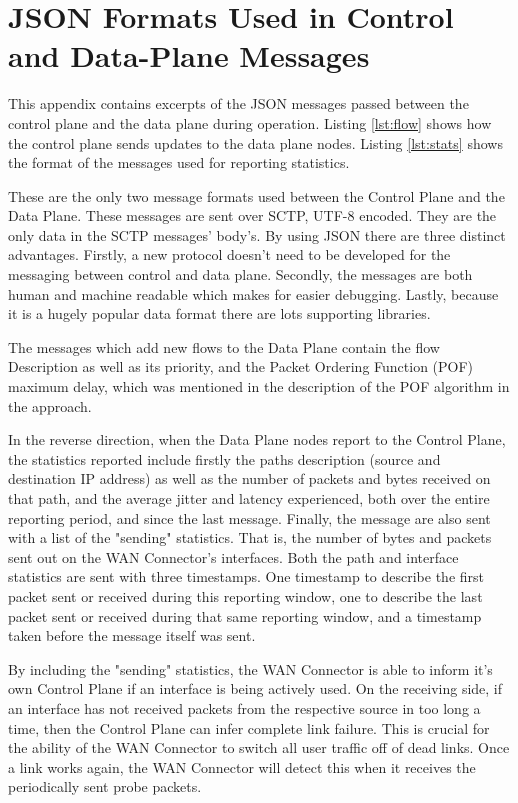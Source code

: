 

\cleardoublepage
\chapter{JSON Formats Used in Control and Data-Plane Messages}
\label{appendix:format}

This appendix contains excerpts of the JSON messages passed between the control plane and the data plane during operation. Listing \ref{lst:flow} shows how the control plane sends updates to the data plane nodes. Listing \ref{lst:stats} shows the format of the messages used for reporting statistics.

These are the only two message formats used between the Control Plane and the Data Plane. These messages are sent over SCTP, UTF-8 encoded. They are the only data in the SCTP messages' body's. By using JSON there are three distinct advantages. Firstly, a new protocol doesn't need to be developed for the messaging between control and data plane. Secondly, the messages are both human and machine readable which makes for easier debugging. Lastly, because it is a hugely popular data format there are lots supporting libraries. 

The messages which add new flows to the Data Plane contain the flow Description as well as its priority, and the Packet Ordering Function (POF) maximum delay, which was mentioned in the description of the POF algorithm in the approach.

In the reverse direction, when the Data Plane nodes report to the Control Plane, the statistics reported include firstly the paths description (source and destination IP address) as well as the number of packets and bytes received on that path, and the average jitter and latency experienced, both over the entire reporting period, and since the last message. Finally, the message are also sent with a list of the "sending" statistics. That is, the number of bytes and packets sent out on the WAN Connector's interfaces. Both the path and interface statistics are sent with three timestamps. One timestamp to describe the first packet sent or received during this reporting window, one to describe the last packet sent or received during that same reporting window, and a timestamp taken before the message itself was sent.

By including the "sending" statistics, the WAN Connector is able to inform it's own Control Plane if an interface is being actively used. On the receiving side, if an interface has not received packets from the respective source in too long a time, then the Control Plane can infer complete link failure. This is crucial for the ability of the WAN Connector to switch all user traffic off of dead links. Once a link works again, the WAN Connector will detect this when it receives the periodically sent probe packets.

